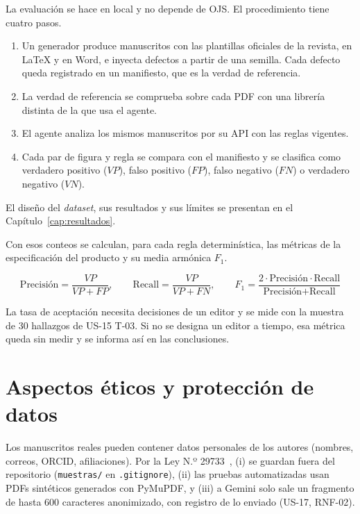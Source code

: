 La evaluación se hace en local y no depende de OJS. El procedimiento tiene cuatro pasos.

\begin{enumerate}
  \item Un generador produce manuscritos con las plantillas oficiales de la revista, en LaTeX y en Word, e inyecta defectos a partir de una semilla. Cada defecto queda registrado en un manifiesto, que es la verdad de referencia.
  \item La verdad de referencia se comprueba sobre cada PDF con una librería distinta de la que usa el agente.
  \item El agente analiza los mismos manuscritos por su API con las reglas vigentes.
  \item Cada par de figura y regla se compara con el manifiesto y se clasifica como verdadero positivo ($VP$), falso positivo ($FP$), falso negativo ($FN$) o verdadero negativo ($VN$).
\end{enumerate}

El diseño del \emph{dataset}, sus resultados y sus límites se presentan en el Capítulo~\ref{cap:resultados}.

Con esos conteos se calculan, para cada regla determinística, las métricas de la especificación del producto y su media armónica $F_1$.

\begin{equation}
  \text{Precisión} = \frac{VP}{VP + FP}, \qquad
  \text{Recall} = \frac{VP}{VP + FN}, \qquad
  F_1 = \frac{2 \cdot \text{Precisión} \cdot \text{Recall}}{\text{Precisión} + \text{Recall}}
\end{equation}

La tasa de aceptación necesita decisiones de un editor y se mide con la muestra de 30 hallazgos de US-15 T-03. Si no se designa un editor a tiempo, esa métrica queda sin medir y se informa así en las conclusiones.

\section{Aspectos éticos y protección de datos}

Los manuscritos reales pueden contener datos personales de los autores (nombres, correos, ORCID, afiliaciones). Por la Ley N.º 29733~\cite{ref36}, (i) se guardan fuera del repositorio (\texttt{muestras/\allowbreak{}} en \texttt{.\allowbreak{}gitignore}), (ii) las pruebas automatizadas usan PDFs sintéticos generados con PyMuPDF, y (iii) a Gemini solo sale un fragmento de hasta 600 caracteres anonimizado, con registro de lo enviado (US-17, RNF-02).
